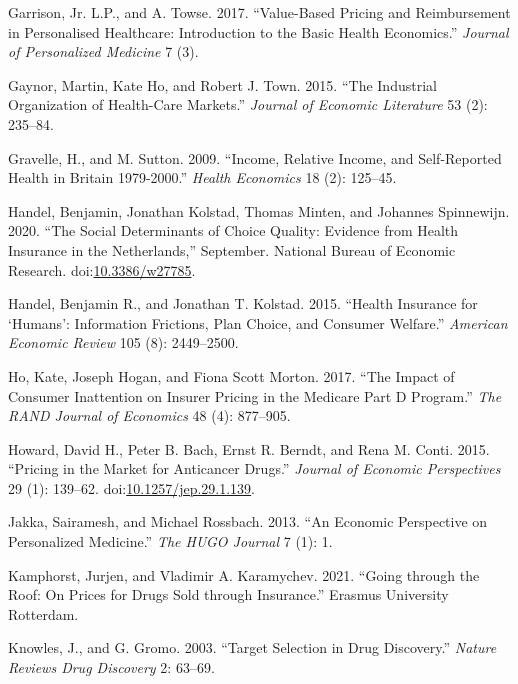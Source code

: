 \documentclass[a4paper,12pt]{article}
\begin{document}
\hypertarget{citeproc_bib_item_17}{Garrison, Jr. L.P., and A. Towse. 2017. “Value-Based Pricing and Reimbursement in Personalised Healthcare: Introduction to the Basic Health Economics.” \textit{Journal of Personalized Medicine} 7 (3).}

\hypertarget{citeproc_bib_item_18}{Gaynor, Martin, Kate Ho, and Robert J. Town. 2015. “The Industrial Organization of Health-Care Markets.” \textit{Journal of Economic Literature} 53 (2): 235–84.}

\hypertarget{citeproc_bib_item_19}{Gravelle, H., and M. Sutton. 2009. “Income, Relative Income, and Self-Reported Health in Britain 1979-2000.” \textit{Health Economics} 18 (2): 125–45.}

\hypertarget{citeproc_bib_item_20}{Handel, Benjamin, Jonathan Kolstad, Thomas Minten, and Johannes Spinnewijn. 2020. “The Social Determinants of Choice Quality: Evidence from Health Insurance in the Netherlands,” September. National Bureau of Economic Research. doi:\href{https://doi.org/10.3386/w27785}{10.3386/w27785}.}

\hypertarget{citeproc_bib_item_21}{Handel, Benjamin R., and Jonathan T. Kolstad. 2015. “Health Insurance for ‘Humans’: Information Frictions, Plan Choice, and Consumer Welfare.” \textit{American Economic Review} 105 (8): 2449–2500.}

\hypertarget{citeproc_bib_item_22}{Ho, Kate, Joseph Hogan, and Fiona Scott Morton. 2017. “The Impact of Consumer Inattention on Insurer Pricing in the Medicare Part D Program.” \textit{The RAND Journal of Economics} 48 (4): 877–905.}

\hypertarget{citeproc_bib_item_23}{Howard, David H., Peter B. Bach, Ernst R. Berndt, and Rena M. Conti. 2015. “Pricing in the Market for Anticancer Drugs.” \textit{Journal of Economic Perspectives} 29 (1): 139–62. doi:\href{https://doi.org/10.1257/jep.29.1.139}{10.1257/jep.29.1.139}.}

\hypertarget{citeproc_bib_item_24}{Jakka, Sairamesh, and Michael Rossbach. 2013. “An Economic Perspective on Personalized Medicine.” \textit{The HUGO Journal} 7 (1): 1.}

\hypertarget{citeproc_bib_item_25}{Kamphorst, Jurjen, and Vladimir A. Karamychev. 2021. “Going through the Roof: On Prices for Drugs Sold through Insurance.” Erasmus University Rotterdam.}

\hypertarget{citeproc_bib_item_26}{Knowles, J., and G. Gromo. 2003. “Target Selection in Drug Discovery.” \textit{Nature Reviews Drug Discovery} 2: 63–69.}
\end{document}
